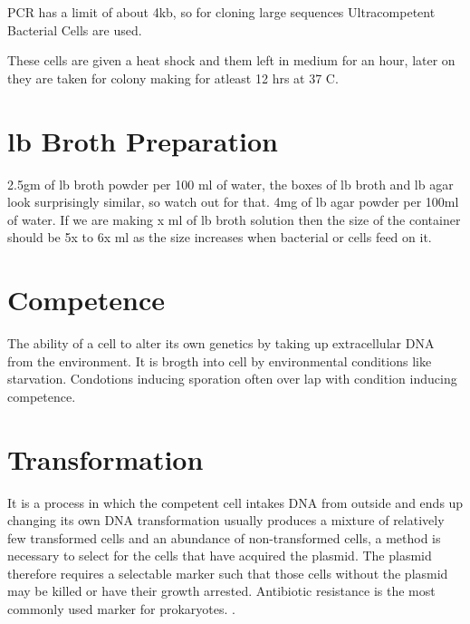 \documentclass[11pt,twoside,a4paper]{article}
\begin{document}
PCR has a limit of about 4kb, so for cloning large sequences Ultracompetent Bacterial Cells are used.

These cells are given a heat shock and them left in medium for an hour, later on they are taken for colony making for atleast 12 hrs at 37 \textdegree C.
\section{lb Broth Preparation}
2.5gm of lb broth powder per 100 ml of water, the boxes of lb broth and lb agar look surprisingly similar, so watch out for that. 4mg of lb agar powder per 100ml of water. If we are making x ml of lb broth solution then the size of the container should be 5x to 6x ml as the size increases when bacterial or cells feed on it.

\section{Competence}
The ability of a cell to alter its own genetics by taking up extracellular DNA from the environment. It is brogth into cell by environmental conditions like starvation. Condotions inducing sporation often over lap with condition inducing competence.

\section{Transformation}
It is a process in which the competent cell intakes DNA from outside and ends up changing its own DNA transformation usually produces a mixture of relatively few transformed cells and an abundance of non-transformed cells, a method is necessary to select for the cells that have acquired the plasmid.
The plasmid therefore requires a selectable marker such that those cells without the plasmid may be killed or have their growth arrested. Antibiotic resistance is the most commonly used marker for prokaryotes. .
\end{document}

